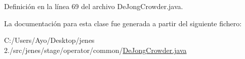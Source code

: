 Definición en la línea 69 del archivo De\-Jong\-Crowder.\-java.



La documentación para esta clase fue generada a partir del siguiente fichero\-:\begin{DoxyCompactItemize}
\item 
C\-:/\-Users/\-Ayo/\-Desktop/jenes 2./src/jenes/stage/operator/common/\hyperlink{_de_jong_crowder_8java}{De\-Jong\-Crowder.\-java}\end{DoxyCompactItemize}
